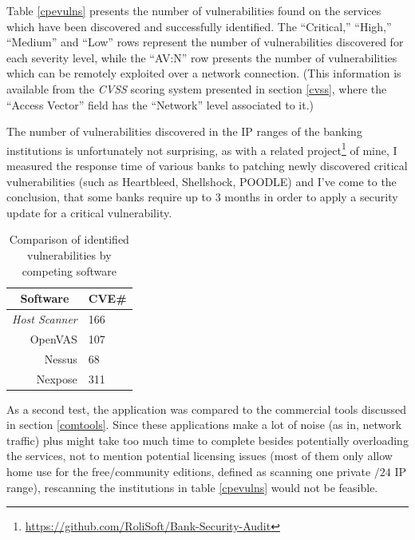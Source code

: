 \documentclass[a4paper,12pt]{article}
\begin{document}
	Table \ref{cpevulns} presents the number of vulnerabilities found on the services which have been discovered and successfully identified. The ``Critical,'' ``High,'' ``Medium'' and ``Low'' rows represent the number of vulnerabilities discovered for each severity level, while the ``AV:N'' row presents the number of vulnerabilities which can be remotely exploited over a network connection. (This information is available from the \textit{CVSS} scoring system presented in section \ref{cvss}, where the ``Access Vector'' field has the ``Network'' level associated to it.)
	
	The number of vulnerabilities discovered in the IP ranges of the banking institutions is unfortunately not surprising, as with a related project\footnote{\url{https://github.com/RoliSoft/Bank-Security-Audit}} of mine, I measured the response time of various banks to patching newly discovered critical vulnerabilities (such as Heartbleed, Shellshock, POODLE) and I've come to the conclusion, that some banks require up to 3 months in order to apply a security update for a critical vulnerability.
	
	\begin{table}[H]
		\centering
		\begin{tabular}{|r|l|}
			\hline
			\multicolumn{1}{|c|}{\textbf{Software}} & \multicolumn{1}{c|}{\textbf{CVE\#}} \\ \hline
			\textit{Host Scanner\footnotemark{}}                   & 166                                 \\
			OpenVAS                                 & 107                                 \\
			Nessus                                  & 68                                  \\
			Nexpose                                 & 311                                 \\ \hline
		\end{tabular}
		\caption{Comparison of identified vulnerabilities by competing software}
		\label{foundvulns}
	\end{table}
	
	As a second test, the application was compared to the commercial tools discussed in section \ref{comtools}. Since these applications make a lot of noise (as in, network traffic) plus might take too much time to complete besides potentially overloading the services, not to mention potential licensing issues (most of them only allow home use for the free/community editions, defined as scanning one private $/24$ IP range), rescanning the institutions in table \ref{cpevulns} would not be feasible.
	
\end{document}
